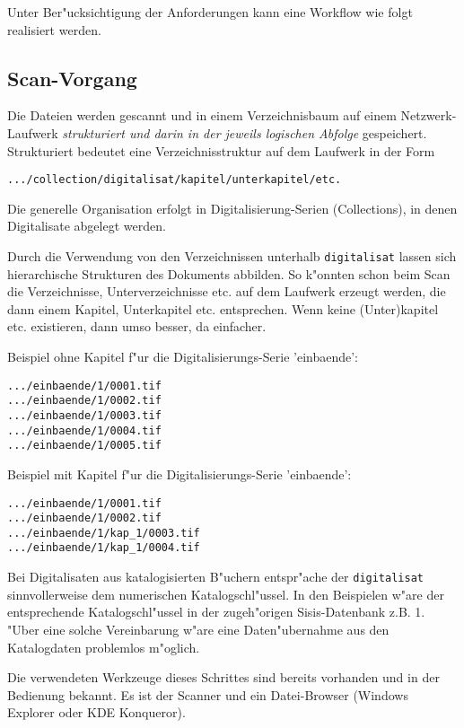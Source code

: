 \documentclass[11pt, twoside, a4paper, BCOR8mm, DIV12, bibtotoc,idxtotoc]{scrreprt}
\begin{document}
Unter Ber"ucksichtigung der Anforderungen kann eine Workflow wie folgt
realisiert werden.

\subsection{Scan-Vorgang}

Die Dateien werden gescannt und in einem Verzeichnisbaum auf einem
Netzwerk-Laufwerk \emph{struk\-tu\-riert und darin in der jeweils logischen
Abfolge} gespeichert. Strukturiert bedeutet eine Verzeich\-nis\-struk\-tur
auf dem Laufwerk in der Form

\begin{verbatim}
.../collection/digitalisat/kapitel/unterkapitel/etc.
\end{verbatim}

Die generelle Organisation erfolgt in Digitalisierung-Serien
(Collections), in denen Digitalisate abgelegt werden. 

Durch die Verwendung von den Verzeichnissen unterhalb
\texttt{digitalisat} lassen sich hierarchische Strukturen des
Dokuments abbilden. So k"onnten schon beim Scan die Verzeichnisse,
Unterverzeich\-nis\-se etc. auf dem Laufwerk erzeugt werden, die dann
einem Kapitel, Unterkapitel etc.  entsprechen. Wenn keine
(Unter)kapitel etc. existieren, dann umso besser, da einfacher.


Beispiel ohne Kapitel f"ur die Digitalisierungs-Serie 'einbaende':

\begin{verbatim}
.../einbaende/1/0001.tif
.../einbaende/1/0002.tif
.../einbaende/1/0003.tif
.../einbaende/1/0004.tif
.../einbaende/1/0005.tif
\end{verbatim}

Beispiel mit Kapitel f"ur die Digitalisierungs-Serie 'einbaende':

\begin{verbatim}
.../einbaende/1/0001.tif
.../einbaende/1/0002.tif
.../einbaende/1/kap_1/0003.tif
.../einbaende/1/kap_1/0004.tif
\end{verbatim}

Bei Digitalisaten aus katalogisierten B"uchern entspr"ache der
\texttt{digitalisat} sinnvollerweise dem numerischen Katalogschl"ussel. In den
Beispielen w"are der entsprechende Katalogschl"ussel in der zugeh"origen
Sisis-Datenbank z.B. 1. "Uber eine solche Vereinbarung w"are eine
Daten"uber\-nahme aus den Katalogdaten problemlos m"oglich.

Die verwendeten Werkzeuge dieses Schrittes sind bereits vorhanden und
in der Bedienung bekannt. Es ist der Scanner und ein Datei-Browser
(Windows Explorer oder KDE Konqueror).
\end{document}
